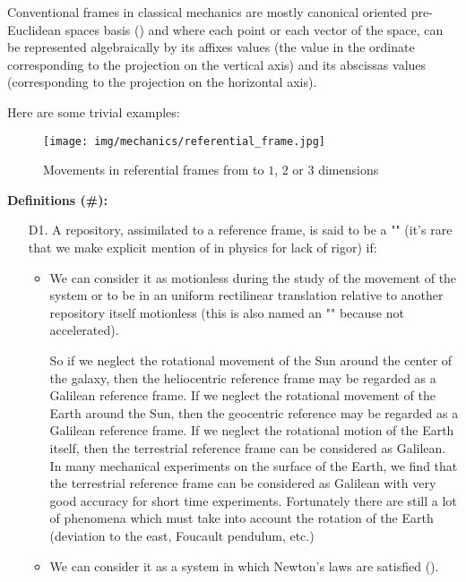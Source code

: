 	Conventional frames in classical mechanics are mostly canonical oriented pre-Euclidean spaces basis () and where each point or each vector of the space, can be represented algebraically by its affixes values (the value in the ordinate corresponding to the projection on the vertical axis) and its abscissas values (corresponding to the projection on the horizontal axis).
	
	Here are some trivial examples:
	\begin{figure}[H]
		\centering
		\texttt{[image: img/mechanics/referential\_frame.jpg]}
		\caption[]{Movements in referential frames from to $1$, $2$ or $3$ dimensions}
	\end{figure}
	\textbf{Definitions (\#\mydef):}
	\begin{enumerate}
		\item[D1.] A repository, assimilated to a reference frame, is said to be a "" (it's rare that we make explicit mention of in physics for lack of rigor) if:
		\begin{itemize}
			\item We can consider it as motionless during the study of the movement of the system or to be in an uniform rectilinear translation relative to another repository itself motionless (this is also named an "" because not accelerated).
			
			So if we neglect the rotational movement of the Sun around the center of the galaxy, then the heliocentric reference frame may be regarded as a Galilean reference frame. If we neglect the rotational movement of the Earth around the Sun, then the geocentric reference may be regarded as a Galilean reference frame. If we neglect the rotational motion of the Earth itself, then the terrestrial reference frame can be considered as Galilean. In many mechanical experiments on the surface of the Earth, we find that the terrestrial reference frame can be considered as Galilean with very good accuracy for short time experiments. Fortunately there are still a lot of phenomena which must take into account the rotation of the Earth (deviation to the east, Foucault pendulum, etc.)
			
			\item We can consider it as a system in which Newton's laws are satisfied ().
		\end{itemize}
		

\end{enumerate}
